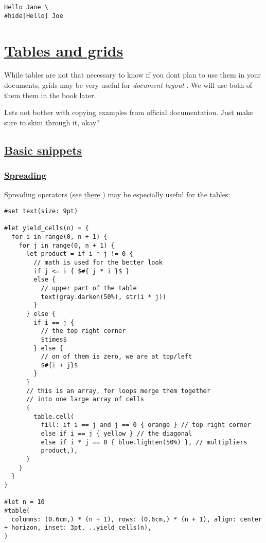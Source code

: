 \begin{verbatim}
Hello Jane \
#hide[Hello] Joe
\end{verbatim}

\pandocbounded{}

\section{\texorpdfstring{\hyperref[tables-and-grids]{Tables and
grids}}{Tables and grids}}\label{tables-and-grids}

While tables are not that necessary to know if you don\textquotesingle t
plan to use them in your documents, grids may be very useful for
\emph{document layout} . We will use both of them them in the book
later.

Let\textquotesingle s not bother with copying examples from official
documentation. Just make sure to skim through it, okay?

\subsection{\texorpdfstring{\hyperref[basic-snippets]{Basic
snippets}}{Basic snippets}}\label{basic-snippets}

\subsubsection{\texorpdfstring{\hyperref[spreading]{Spreading}}{Spreading}}\label{spreading}

Spreading operators (see
\href{basics/must_know/../scripting/arguments.html}{there} ) may be
especially useful for the tables:

\begin{verbatim}
#set text(size: 9pt)

#let yield_cells(n) = {
  for i in range(0, n + 1) {
    for j in range(0, n + 1) {
      let product = if i * j != 0 {
        // math is used for the better look
        if j <= i { $#{ j * i }$ }
        else {
          // upper part of the table
          text(gray.darken(50%), str(i * j))
        }
      } else {
        if i == j {
          // the top right corner
          $times$
        } else {
          // on of them is zero, we are at top/left
          $#{i + j}$
        }
      }
      // this is an array, for loops merge them together
      // into one large array of cells
      (
        table.cell(
          fill: if i == j and j == 0 { orange } // top right corner
          else if i == j { yellow } // the diagonal
          else if i * j == 0 { blue.lighten(50%) }, // multipliers
          product,),
      )
    }
  }
}

#let n = 10
#table(
  columns: (0.6cm,) * (n + 1), rows: (0.6cm,) * (n + 1), align: center + horizon, inset: 3pt, ..yield_cells(n),
)
\end{verbatim}

